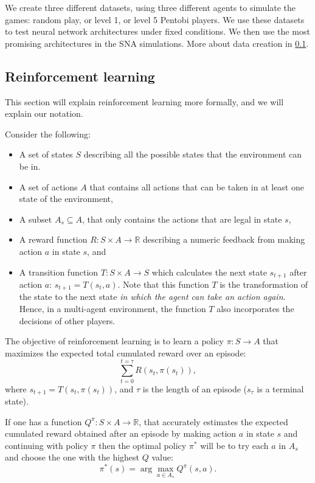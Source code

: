 \documentclass{article}
\begin{document}
We create three different datasets, using three different agents to simulate the games: random play, or level 1, or level 5 Pentobi players. We use these datasets to test neural network architectures under fixed conditions. We then use the most promising architectures in the SNA simulations. More about data creation in \ref{}.

\subsection{Reinforcement learning}
This section will explain reinforcement learning more formally, and we will explain our notation.

\noindent Consider the following:
\begin{itemize}
\item A set of states $S$ describing all the possible states that the environment can be in.
\item A set of actions $A$ that contains all actions that can be taken in at least one state of the environment,
\item A subset $A_s \subseteq A$, that only contains the actions that are legal in state $s$,
\item A reward function $R: S\times A \rightarrow \mathbb{R}$ describing a numeric feedback from making action $a$ in state $s$, and
\item A transition function $T : S\times A \rightarrow S$ which calculates the next state $s_{t+1}$ after action $a$: $s_{t+1} = T(s_t,a)$. Note that this function $T$ is the transformation of the state to the next state \emph{in which the agent can take an action again}. Hence, in a multi-agent environment, the function $T$ also incorporates the decisions of other players.
\end{itemize}
The objective of reinforcement learning is to learn a policy $\pi : S \rightarrow A$ that maximizes the expected total cumulated reward over an episode:$$\sum_{t=0}^{t=\tau}R(s_t,\pi(s_t)),$$ where $s_{t+1}=T(s_t,\pi(s_t))$, and $\tau$ is the length of an episode ($s_\tau$ is a terminal state).

If one has a function $Q^{\pi} : S\times A \rightarrow \mathbb{R}$, that accurately estimates the expected cumulated reward obtained after an episode by making action $a$ in state $s$ and continuing with policy $\pi$ then the optimal policy $\pi^*$ will be to try each $a$ in $A_s$ and choose the one with the highest $Q$ value: $$\pi^{*}(s) = \arg\!\max_{a \in A_s} Q^\pi(s,a).$$
\end{document}
